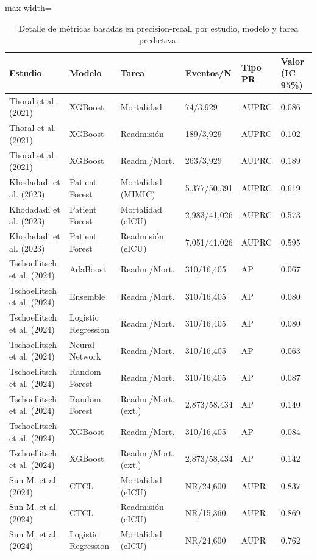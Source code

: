 \begin{table}[H]
\centering
\caption{Detalle de métricas basadas en precision-recall por estudio, modelo y tarea predictiva.}\label{tab:detalle_pr}
\small
\begin{adjustbox}{max width=\textwidth}
\begin{tabular}{llllll}
\toprule
\textbf{Estudio} & \textbf{Modelo} & \textbf{Tarea} & \textbf{Eventos/N} & \textbf{Tipo PR} & \textbf{Valor (IC 95\%)} \\
\midrule
    Thoral et al. (2021) & XGBoost & Mortalidad & 74/3,929 & AUPRC & 0.086 \\
    Thoral et al. (2021) & XGBoost & Readmisión & 189/3,929 & AUPRC & 0.102 \\
    Thoral et al. (2021) & XGBoost & Readm./Mort. & 263/3,929 & AUPRC & 0.189 \\
    Khodadadi et al. (2023) & Patient Forest & Mortalidad (MIMIC) & 5,377/50,391 & AUPRC & 0.619 \\
    Khodadadi et al. (2023) & Patient Forest & Mortalidad (eICU) & 2,983/41,026 & AUPRC & 0.573 \\
    Khodadadi et al. (2023) & Patient Forest & Readmisión (eICU) & 7,051/41,026 & AUPRC & 0.595 \\
    Tschoellitsch et al. (2024) & AdaBoost & Readm./Mort. & 310/16,405 & AP & 0.067 \\
    Tschoellitsch et al. (2024) & Ensemble & Readm./Mort. & 310/16,405 & AP & 0.080 \\
    Tschoellitsch et al. (2024) & Logistic Regression & Readm./Mort. & 310/16,405 & AP & 0.080 \\
    Tschoellitsch et al. (2024) & Neural Network & Readm./Mort. & 310/16,405 & AP & 0.063 \\
    Tschoellitsch et al. (2024) & Random Forest & Readm./Mort. & 310/16,405 & AP & 0.087 \\
    Tschoellitsch et al. (2024) & Random Forest & Readm./Mort. (ext.) & 2,873/58,434 & AP & 0.140 \\
    Tschoellitsch et al. (2024) & XGBoost & Readm./Mort. & 310/16,405 & AP & 0.084 \\
    Tschoellitsch et al. (2024) & XGBoost & Readm./Mort. (ext.) & 2,873/58,434 & AP & 0.142 \\
    Sun M. et al. (2024) & CTCL & Mortalidad (eICU) & NR/24,600 & AUPR & 0.837 \\
    Sun M. et al. (2024) & CTCL & Readmisión (eICU) & NR/15,360 & AUPR & 0.869 \\
    Sun M. et al. (2024) & Logistic Regression & Mortalidad (eICU) & NR/24,600 & AUPR & 0.762 \\

\end{tabular}
\end{adjustbox}
\end{table}
